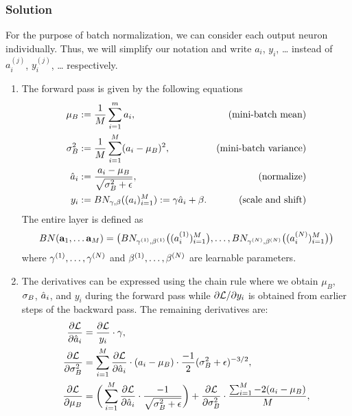 \documentclass[
  letterpaper,
  DIV=11,
  numbers=noendperiod]{scrartcl}
\begin{document}
\subsubsection{Solution}\label{solution-1}

For the purpose of batch normalization, we can consider each output
neuron individually. Thus, we will simplify our notation and write
\(a_i\), \(y_i\), \ldots{} instead of \(a_i^{(j)}\), \(y_i^{(j)}\),
\ldots{} respectively.

\begin{enumerate}
\def\labelenumi{(\alph{enumi})}
\item
  The forward pass is given by the following equations \[
  \begin{aligned}
  \mu_B 
    &:= \frac{1}{M}\sum_{i=1}^m a_i, 
    &\text{(mini-batch mean)}  \\
  \sigma_B^2 
    &:=\frac{1}{M}\sum_{i=1}^M (a_i-\mu_B)^2,
    &\text{(mini-batch variance)}\\
  \hat{a}_i 
    &:= \frac{a_i-\mu_B}{\sqrt{\sigma_B^2+\epsilon}},   
  &\text{(normalize)}\\
    y_i
    &:= BN_{\gamma, \beta}((a_i)_{i=1}^M)
    := \gamma\hat{a}_i + \beta.
    &\text{(scale and shift)}
  \end{aligned}
  \] The entire layer is defined as \[
  BN(\mathbf{a}_1, \ldots \mathbf{a}_M)=\big(
    BN_{\gamma^{(1)}, \beta^{(1)}}\big((a_i^{(1)})_{i=1}^M\big),
    \ldots, 
    BN_{\gamma^{(N)}, \beta^{(N)}}\big((a_i^{(N)})_{i=1}^M\big)
    \big)
  \] where \(\gamma^{(1)}, \ldots, \gamma^{(N)}\) and
  \(\beta^{(1)}, \ldots, \beta^{(N)}\) are learnable parameters.
\item
  The derivatives can be expressed using the chain rule where we obtain
  \(\mu_B\), \(\sigma_B\), \(\hat{a}_i\), and \(y_i\) during the forward pass
  while \(\partial \mathcal{L}/\partial y_i\) is obtained from earlier steps of
  the backward pass. The remaining derivatives are: \[
  \begin{aligned}
  \frac{\partial\mcL}{\partial \ha_i} &= \fr{\partial \mcL}{y_i}\cdot \gm, \\ 
  \frac{\partial\mcL}{\partial \si_B^2}
    &= 
    \sum_{i=1}^M \fr{\partial\mcL}{\partial\ha_i}\cdot(a_i-\mu_B)\cdot
    \frac{-1}{2}(\si_B^2+\epsilon)^{-3/2}, \\ 
  \fr{\partial\mcL}{\partial\mu_B} 
    &=
    \bigg(\sum_{i=1}^M \fr{\partial\mcL}{\partial\ha_i}
    \cdot\frac{-1}{\sqrt{\sigma_B^2+\epsilon}}\bigg) 
    +\fr{\partial\mcL}{ \partial \si_B^2}
    \cdot\frac{\sum_{i=1}^M  -2(a_i-\mu_B)}{M},\\

\end{aligned}\]
\end{enumerate}
\end{document}
